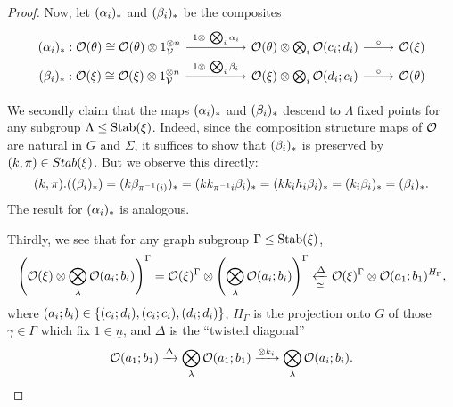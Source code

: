 \documentclass[a4paper,10pt
,draft
]{article}%
\renewcommand{\1}{\ensuremath{\mathbb{id}}}
\begin{document}
\begin{proof}
      Now, let $(\alpha_i)_{\**}$ and $(\beta_i)_{\**}$ be the composites
      \begin{equation}
            \begin{tikzcd}[row sep = tiny]
                  (\alpha_i)_{\**} : 
                  \O(\theta)
                  \cong
                  \O(\theta) \otimes 1_\V^{\otimes n} \arrow[rr, "1 \otimes\ \bigotimes_i \alpha_i"]
                  &&
                  \O(\theta) \otimes \bigotimes_i \O(c_i;d_i) \arrow[r,"\circ"]
                  &
                  \O(\ksi)
                  \\
                  (\beta_i)_{\**} :
                  \O(\ksi)
                  \cong
                  \O(\ksi) \otimes 1_\V^{\otimes n} \arrow[rr, "1 \otimes\ \bigotimes_i \beta_i"]
                  &&
                  \O(\ksi) \otimes \bigotimes_i \O(d_i;c_i) \arrow[r,"\circ"]
                  &
                  \O(\theta)
            \end{tikzcd}
      \end{equation}

      We secondly claim that the maps $(\alpha_i)_{\**}$ and $(\beta_i)_{\**}$ descend to $\Lambda$ fixed points 
      for any subgroup $\Lambda \leq \mathrm{Stab}(\xi)$.
      Indeed, since the composition structure maps of $\mathcal{O}$ are natural in $G$ and $\Sigma$,
      it suffices to show that $(\beta_i)_{\**}$ is preserved by $(k,\pi)\in Stab(\xi)$.
      But we observe this directly:
      \begin{equation}
            (k, \pi) . ((\beta_i)_{\**})
            =
            (k \beta_{\pi^{-1}(i)})_{\**}
            =
            (k k_{\pi^{-1}i} \beta_i)_{\**}
            =
            (k k_i h_i \beta_i)_{\**}
            =
            (k_i \beta_i)_{\**}
            =
            (\beta_i)_{\**}.
      \end{equation}
      The result for $(\alpha_i)_{\**}$ is analogous.
      
      Thirdly, we see that for any graph subgroup $\Gamma \leq \mathrm{Stab}(\xi)$, 
      \begin{equation}
            \left(
                  \mathcal{O}(\xi) \otimes \bigotimes_\lambda \mathcal{O}(a_i;b_i)
            \right)^\Gamma
            =
            \mathcal{O}(\xi)^\Gamma \otimes \left(
                  \bigotimes_\lambda \mathcal{O}(a_i; b_i)
            \right)^\Gamma
            \underset{\simeq}{\xleftarrow{\Delta}}
            \mathcal{O}(\xi)^\Gamma \otimes \mathcal{O}(a_1;b_1)^{H_\Gamma},
      \end{equation}
      where
      $(a_i;b_i) \in \left\{(c_i;d_i), (c_i;c_i), (d_i;d_i)\right\}$,
      $H_\Gamma$ is the projection onto $G$ of those $\gamma \in \Gamma$ which fix $1 \in \underline{n}$,
      and $\Delta$ is the ``twisted diagonal''
      \begin{equation}
            \mathcal{O}(a_1;b_1) \xrightarrow{\Delta} \bigotimes_\lambda \mathcal{O}(a_1;b_1) \xrightarrow{\otimes k_i} \bigotimes_\lambda \mathcal{O}(a_i;b_i).
      \end{equation}


\end{proof}
\end{document}
